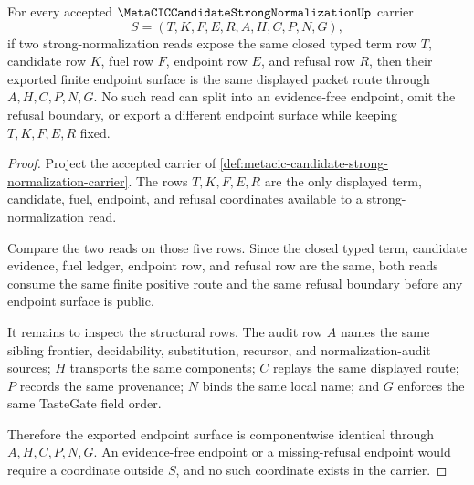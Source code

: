 \begin{theorem}
\label{thm:metacic-candidate-strong-normalization-fuel-refusal-determinacy}
For every accepted $\MetaCICCandidateStrongNormalizationUp$ carrier
$$
S=(T,K,F,E,R,A,H,C,P,N,G),
$$
if two strong-normalization reads expose the same closed typed term row $T$, candidate row $K$, fuel row $F$, endpoint row $E$, and refusal row $R$, then their exported finite endpoint surface is the same displayed packet route through $A,H,C,P,N,G$. No such read can split into an evidence-free endpoint, omit the refusal boundary, or export a different endpoint surface while keeping $T,K,F,E,R$ fixed.
\end{theorem}
\begin{proof}
Project the accepted carrier of \autoref{def:metacic-candidate-strong-normalization-carrier}. The rows $T,K,F,E,R$ are the only displayed term, candidate, fuel, endpoint, and refusal coordinates available to a strong-normalization read.

Compare the two reads on those five rows. Since the closed typed term, candidate evidence, fuel ledger, endpoint row, and refusal row are the same, both reads consume the same finite positive route and the same refusal boundary before any endpoint surface is public.

It remains to inspect the structural rows. The audit row $A$ names the same sibling frontier, decidability, substitution, recursor, and normalization-audit sources; $H$ transports the same components; $C$ replays the same displayed route; $P$ records the same provenance; $N$ binds the same local name; and $G$ enforces the same TasteGate field order.

Therefore the exported endpoint surface is componentwise identical through $A,H,C,P,N,G$. An evidence-free endpoint or a missing-refusal endpoint would require a coordinate outside $S$, and no such coordinate exists in the carrier.
\end{proof}

